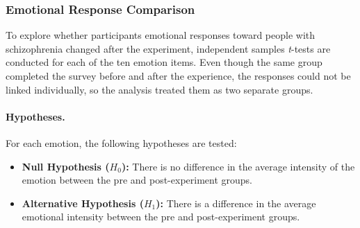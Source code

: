 

\subsubsection{Emotional Response Comparison}

To explore whether participants emotional responses toward people with schizophrenia changed after the experiment, independent samples \textit{t}-tests are conducted for each of the ten emotion items. Even though the same group completed the survey before and after the experience, the responses could not be linked individually, so the analysis treated them as two separate groups.

\paragraph{Hypotheses.} For each emotion, the following hypotheses are tested:

\begin{itemize}
    \item \textbf{Null Hypothesis ($H_0$):} There is no difference in the average intensity of the emotion between the pre and post-experiment groups.
    \item \textbf{Alternative Hypothesis ($H_1$):} There is a difference in the average emotional intensity between the pre and post-experiment groups.
\end{itemize}


